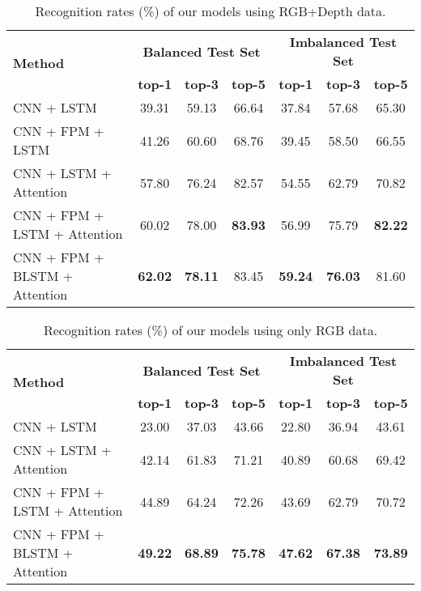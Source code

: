\documentclass[11pt, a4paper, singlecolumn]{article}
\begin{document}
\begin{table} 
	\caption{Recognition rates (\%) of our models using RGB+Depth data.}
	\centering
	\begin{tabular}{l|ccc|ccc}
		\hline
		\multirow{2}{*}{\textbf{Method}} &
		
		\multicolumn{3}{c}{\textbf{Balanced Test Set}} & \multicolumn{3}{c}{\textbf{Imbalanced Test Set}}                                                                                                                                                                       \\ 
		& {\textbf{top-1}} & {\textbf{top-3}} & {\textbf{top-5}} & {\textbf{top-1}} & {\textbf{top-3}} & {\textbf{top-5}} \\ \hline
		
		CNN + LSTM  & 39.31 & 59.13 & 66.64 & 37.84 & 57.68 & 65.30 \\
		CNN + FPM + LSTM & 41.26 & 60.60 & 68.76 & 39.45 & 58.50 & 66.55 \\ 
		CNN + LSTM + Attention  & 57.80 & 76.24 & 82.57 & 54.55 & 62.79 & 70.82 \\  \hline
		CNN + FPM + LSTM + Attention  & 60.02 & 78.00 & \textbf{83.93} & 56.99 & 75.79 & \textbf{82.22} \\ 
		CNN + FPM + BLSTM + Attention  & \textbf{62.02} & \textbf{78.11} & 83.45 & \textbf{59.24} & \textbf{76.03} & 81.60 \\ \hline		
		
	\end{tabular}
	\label{tab:autsl_rgbd}
\end{table}

\begin{table} 
	\caption{Recognition rates (\%) of our models using only RGB data.}
	\centering
	\begin{tabular}{l|ccc|ccc}
		\hline
		\multirow{2}{*}{\textbf{Method}} &
		
		\multicolumn{3}{c}{\textbf{Balanced Test Set}} & \multicolumn{3}{c}{\textbf{Imbalanced Test Set}}                                                                                                                                                                       \\ 
		& {\textbf{top-1}} & {\textbf{top-3}} & {\textbf{top-5}} & {\textbf{top-1}} & {\textbf{top-3}} & {\textbf{top-5}} \\ \hline
		
		CNN + LSTM  & 23.00 & 37.03 & 43.66 & 22.80 & 36.94 & 43.61 \\ CNN + LSTM + Attention  & 42.14 & 61.83 & 71.21 & 40.89 & 60.68 & 69.42 \\ 
		CNN + FPM + LSTM + Attention   & 44.89 & 64.24 & 72.26 & 43.69 & 62.79 & 70.72 \\
		CNN + FPM + BLSTM + Attention   & \textbf{49.22} & \textbf{68.89} & \textbf{75.78} & \textbf{47.62} & \textbf{67.38} & \textbf{73.89}  \\ \hline		
		
	\end{tabular}
	\label{tab:autsl_rgb}
\end{table}
\end{document}
